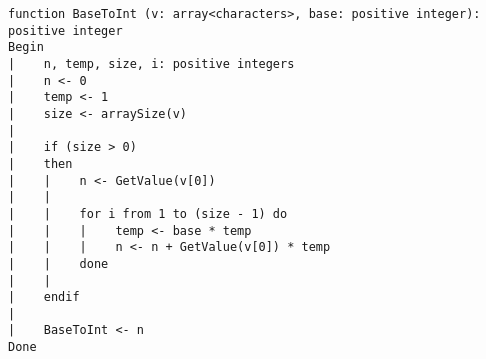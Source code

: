 \begin{lstlisting}
function BaseToInt (v: array<characters>, base: positive integer): positive integer
Begin
|    n, temp, size, i: positive integers
|    n <- 0
|    temp <- 1
|    size <- arraySize(v)
|
|    if (size > 0)
|    then
|    |    n <- GetValue(v[0])
|    |
|    |    for i from 1 to (size - 1) do
|    |    |    temp <- base * temp
|    |    |    n <- n + GetValue(v[0]) * temp
|    |    done
|    |
|    endif
|
|    BaseToInt <- n
Done
\end{lstlisting}
